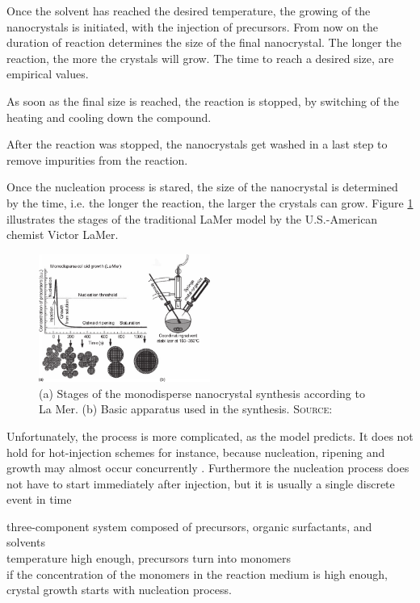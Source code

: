 		Once the solvent has reached the desired temperature, the growing of the nanocrystals is initiated, with the injection of precursors. From now on
		the duration of reaction determines the size of the final nanocrystal. The longer the reaction, the more the crystals will grow.
		The time to reach a desired size, are empirical values.
		
		As soon as the final size is reached, the reaction is stopped, by switching of the heating and cooling down the compound.
		
		After the reaction was stopped, the nanocrystals get washed in a last step to remove impurities from the reaction.
		
		
		Once the nucleation process is stared, the size of the nanocrystal is determined by the time,
		i.e. the longer the reaction, the larger the crystals can grow. Figure \ref{fig:LaMer} illustrates the stages of
		the traditional LaMer model by the U.S.-American chemist Victor LaMer. 
		\begin{figure}
			\centering
			\includegraphics[width=0.5\textwidth]{Fig/LaMer.pdf}
			\caption{(a) Stages of the monodisperse nanocrystal synthesis according to La Mer. (b) Basic apparatus used in the synthesis. {\scshape Source:} \cite[p.4]{Klimov}}
			\label{fig:LaMer}
		\end{figure}
		Unfortunately, the process is more complicated, as the model predicts. It does not hold for hot-injection schemes for instance,
		because nucleation, ripening and growth may almost occur concurrently \cite[p.5]{Klimov}. Furthermore the nucleation process
		does not have to start immediately after injection, but it is usually a single discrete event in time
		
		three-component system composed of precursors, organic surfactants, and solvents	\\
		temperature high enough, precursors turn into monomers							\\
		if the concentration of the monomers in the reaction medium is high enough, crystal growth
		starts with nucleation process.																			\\
		
